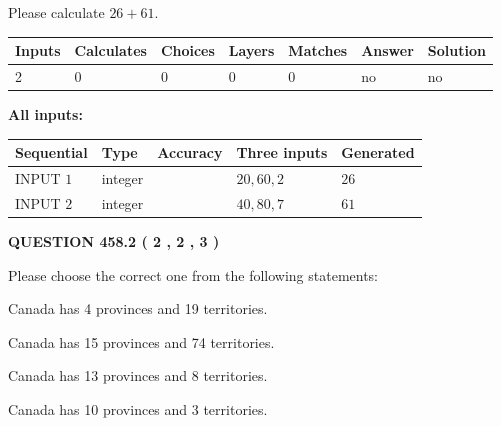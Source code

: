 \documentclass[12pt]{article}
\begin{document}
  
 
Please calculate $ %
26 +  %
61 $.
 
 
   
   
   
   
\noindent\begin{tabular}{|l|l|l|l|l|l|l|}
 \hline
Inputs & Calculates & Choices & Layers & Matches & Answer & Solution \\ \hline
 2  & 
 0  & 
 0
  & 
 0  & 
 0  & 
  no & 
  no 
  \\ \hline
 \end{tabular}
   
   
   
   
\noindent{}
   
   
   
   
\noindent\vspace{0.1in}\hspace{-0.08in} {\textbf{\Large{All inputs: }}}
   
   
  
  
\noindent\begin{tabular}{|l|l|l|l|l|}
\hline
 Sequential & Type & Accuracy & Three inputs & Generated \\ 
\hline
 
 
  INPUT $  1 $ & integer &  & $
 20
 , 
 60
 , 
 2
 $ & $ 26 $ 
 \\  \hline  
 
 
  INPUT $  2 $ & integer &  & $
 40
 , 
 80
 , 
 7
 $ & $ 61 $ 
 \\  \hline  
 \end{tabular}
   
   
  
\vspace{0.2in}
  
{\textbf{\Large{QUESTION
458.2 
 ( 2 , 2 , 3 )
}}}
  
  
Please choose the correct one from the following statements:
 
 
Canada has   4 provinces and  19 territories.
 
 
Canada has  15 provinces and  74 territories.
 
 
Canada has  13 provinces and  8 territories.
 
 
Canada has 10  provinces and 3 territories.
 
\end{document}
